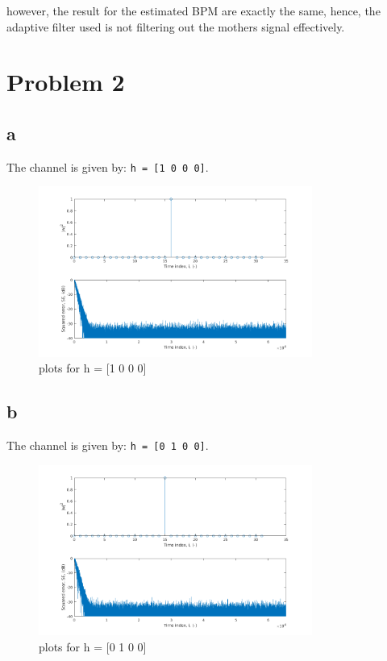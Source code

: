 \documentclass[12pt,letterpaper]{article}
\begin{document}
however, the result for the estimated BPM are exactly the same, hence, the adaptive filter used is not filtering out the mothers signal 
effectively.


\section{Problem 2}
\subsection{a}
The channel is given by: \texttt{h = [1 0 0 0]}.

\begin{figure}[!h] 
  \centering
  \includegraphics[width=0.8\textwidth]{../matlab/img/f1.png}
  \caption{plots for h = [1 0 0 0]}
  \label{fig:f1}
\end{figure}

\subsection{b}
The channel is given by: \texttt{h = [0 1 0 0]}.

\begin{figure}[!h] 
  \centering
  \includegraphics[width=0.8\textwidth]{../matlab/img/f2.png}
  \caption{plots for h = [0 1 0 0]}
  \label{fig:f2}
\end{figure}
\end{document}
